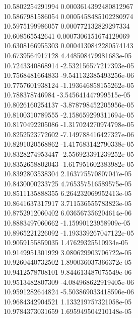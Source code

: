 {10.5802254291994 0.0003614392480812967 \\
10.5867981586054 0.0005458485102280974 \\
10.5975199986057 0.000772132829297334 \\
10.608565542641 0.0007306151674129069 \\
10.6308166955303 0.0004130842280574143 \\
10.6739564917128 4.448508479981683e-05 \\
10.7243340868914 -2.532156577217393e-05 \\
10.7568481664833 -9.541132385493256e-06 \\
10.7757601938124 -1.193646858155262e-05 \\
10.788378746984 -3.545641447999515e-05 \\
10.8026160254137 -3.878798452205956e-05 \\
10.8100310789555 -2.158659299311694e-05 \\
10.8170492205086 -1.317024270974798e-05 \\
10.8252523772602 -7.149788416427327e-06 \\
10.8291020568862 -1.417683142790338e-05 \\
10.8328274953447 -2.556923391239252e-05 \\
10.8352658802043 -1.617951602383982e-05 \\
10.8392803538304 2.163775570807047e-05 \\
10.8430000233725 4.765357516589575e-05 \\
10.8511135888355 6.264232069952413e-05 \\
10.8641637317917 3.711536555783823e-05 \\
10.8752912060402 6.036567356204614e-06 \\
10.8883497060662 -1.15990123958909e-05 \\
10.8965221226092 -1.193339267047122e-05 \\
10.9059155859035 1.47629325510934e-05 \\
10.9149951301929 3.080629903706722e-05 \\
10.9260440732502 1.890036037366372e-05 \\
10.9412578708101 9.844613487075549e-06 \\
10.9513482807309 -4.084968622919405e-06 \\
10.9591282644824 -5.503869033418596e-06 \\
10.9684342904521 1.133219757321058e-05 \\
10.9784373031659 1.695949504210148e-05 \\
}
